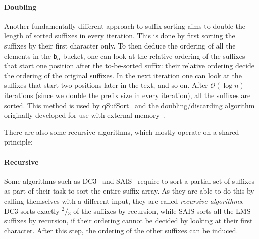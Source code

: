 \paragraph{Doubling} Another fundamentally different approach to suffix sorting
aims to double the length of sorted suffixes in every iteration.
This is done by first sorting the suffixes by their first character only.
To then deduce the ordering of all the elements in the $\mathsf b_\alpha$ bucket,
one can look at the relative ordering of the suffixes that start one position
after the to-be-sorted suffix:
their relative ordering decide the ordering of the original suffixes.
In the next iteration one can look at the suffixes that start two positions later in the text,
and so on.
After $\mathcal O(\log n)$ iterations (since we double the prefix size in every iteration),
all the suffixes are sorted.
This method is used by qSufSort~\cite{saca:1} and the
doubling/discarding algorithm originally developed for use with external memory~\cite{saca:11}.

\bigskip

There are also some recursive algorithms, which mostly operate on a shared principle:
%
\paragraph{Recursive} Some algorithms such as DC3~\cite{saca:9} and SAIS~\cite{saca:6} require to sort a
partial set of suffixes as part of their task to sort the entire suffix array.
As they are able to do this by calling themselves with a different input, they are called \emph{recursive algorithms}.
DC3 sorts exactly $^2\!/\!_3$ of the suffixes by recursion, while SAIS sorts all the LMS suffixes by recursion,
if their ordering cannot be decided by looking at their first character.
After this step, the ordering of the other suffixes can be induced.

